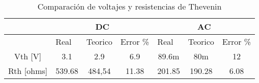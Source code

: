 \begin{table}[!htpb]
	\centering
	\begin{tabular}{|l|ccc|ccc|}
		\hline
		                                     & \multicolumn{3}{c|}{DC}     & \multicolumn{3}{c|}{AC}                                                                                                                                   \\ \hline
		                                     & \multicolumn{1}{l|}{Real}   & \multicolumn{1}{l|}{Teorico} & \multicolumn{1}{l|}{Error \%} & \multicolumn{1}{l|}{Real}   & \multicolumn{1}{l|}{Teorico} & \multicolumn{1}{l|}{Error \%} \\ \hline
		\multicolumn{1}{|c|}{Vth {[}V{]}}    & \multicolumn{1}{c|}{3.1}    & \multicolumn{1}{c|}{2.9}     & 6.9                           & \multicolumn{1}{c|}{89.6m}  & \multicolumn{1}{c|}{80m}     & 12                            \\ \hline
		\multicolumn{1}{|c|}{Rth {[}ohms{]}} & \multicolumn{1}{c|}{539.68} & \multicolumn{1}{c|}{484,54}  & 11.38                         & \multicolumn{1}{c|}{201.85} & \multicolumn{1}{c|}{190.28}  & 6.08                          \\ \hline
	\end{tabular}
	\caption{Comparación de voltajes y resistencias de Thevenin}
	\label{Tabla comparativa valores Thevenin}
\end{table}